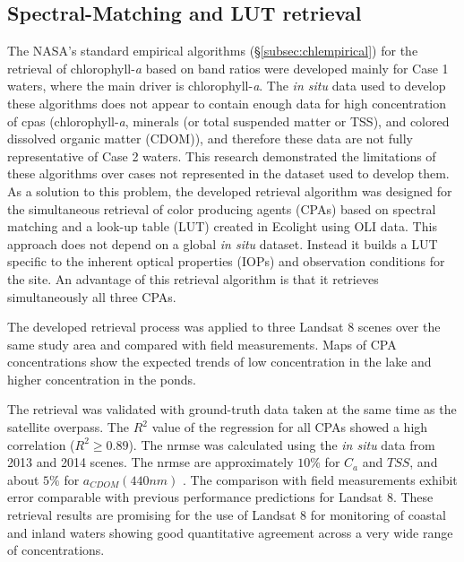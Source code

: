 \subsection{Spectral-Matching and LUT retrieval}
The NASA's standard empirical algorithms (\S\ref{subsec:chlempirical}) for the retrieval of chlorophyll-{\it a} based on band ratios were developed mainly for Case 1 waters, where the main driver is chlorophyll-{\it a}. The {\it in situ} data used to develop these algorithms does not appear to contain enough data for high concentration of \gls{cpas} (chlorophyll-{\it a}, minerals (or total suspended matter or TSS), and colored dissolved organic matter (CDOM)), and therefore these data are not fully representative of Case 2 waters. This research demonstrated the limitations of these algorithms over cases not represented in the dataset used to develop them. As a solution to this problem, the developed retrieval algorithm was designed for the simultaneous retrieval of color producing agents (CPAs) based on spectral matching and a look-up table (LUT) created in Ecolight using OLI data. This approach does not depend on a global {\it in situ} dataset. Instead it builds a LUT specific to the inherent optical properties (IOPs) and observation conditions for the site. An advantage of this retrieval algorithm is that it retrieves simultaneously all three CPAs.

The developed retrieval process was applied to three  Landsat 8 scenes over the same study area and compared with field measurements. Maps of CPA concentrations show the expected trends of low concentration in the lake and higher concentration in the ponds.  

The retrieval was validated with ground-truth data taken at the same time as the satellite overpass. The $R^2$ value of the regression for all CPAs showed a high correlation ($R^2\geq0.89$). The \gls{nrmse} was calculated using the {\it in situ} data from 2013 and 2014 scenes. The \gls{nrmse} are approximately $10\%$ for $C_a$ and $TSS$, and about $5\%$ for $a_{CDOM}(440nm)$ \cite{Gerace:2013}. The comparison with field measurements exhibit error comparable with previous performance predictions for Landsat 8. These retrieval results are promising for the use of Landsat 8 for monitoring of coastal and inland waters showing good quantitative agreement across a very wide range of concentrations.

